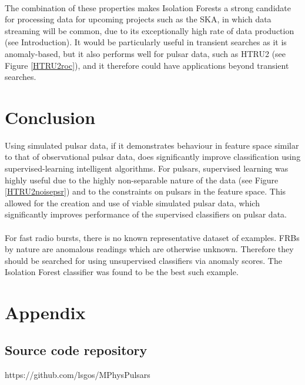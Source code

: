\documentclass[12pt]{article}
\begin{document}
\paragraph{}
The combination of these properties makes Isolation Forests a strong candidate for processing data for upcoming projects such as the SKA, in which data streaming will be common, due to its exceptionally high rate of data production (see Introduction). It would be particularly useful in transient searches as it is anomaly-based, but it also performs well for pulsar data, such as HTRU2 (see Figure \ref{HTRU2roc}), and it therefore could have applications beyond transient searches.

\section{Conclusion}
Using simulated pulsar data, if it demonstrates behaviour in feature space similar to that of observational pulsar data, does significantly improve classification using supervised-learning intelligent algorithms. For pulsars, supervised learning was highly useful due to the highly non-separable nature of the data (see Figure \ref{HTRU2noisepsr}) and to the constraints on pulsars in the feature space. This allowed for the creation and use of viable simulated pulsar data, which significantly improves performance of the supervised classifiers on pulsar data.
\paragraph{}
For fast radio bursts, there is no known representative dataset of examples. FRBs by nature are anomalous readings which are otherwise unknown. Therefore they should be searched for using unsupervised classifiers via anomaly scores. The Isolation Forest classifier was found to be the best such example.

\begin{small}


\end{small}

\section{Appendix}
\subsection{Source code repository}
https://github.com/lsgos/MPhysPulsars
\end{document}
